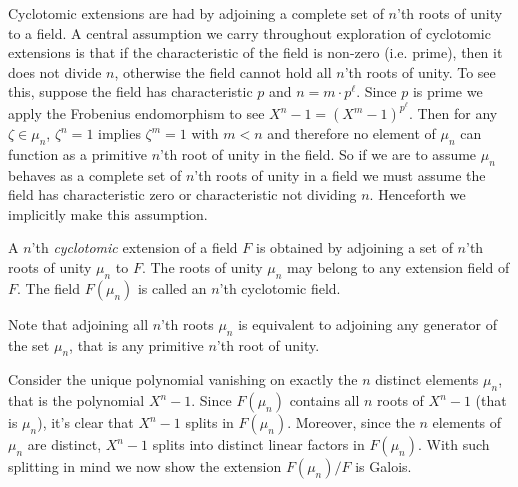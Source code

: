 Cyclotomic extensions are had by adjoining a complete set of $n$'th roots of unity to a field.
A central assumption we carry throughout exploration of cyclotomic extensions is that if the characteristic of the field is non-zero (i.e. prime), then it does not divide $n$, otherwise the field cannot hold all $n$'th roots of unity.
To see this, suppose the field has characteristic $p$ and $n=m\cdot p^\ell$.
Since $p$ is prime we apply the Frobenius endomorphism to see $X^n-1=(X^m-1)^{p^\ell}$.
Then for any $\zeta\in\mu_n$, $\zeta^n=1$ implies $\zeta^m=1$ with $m<n$ and therefore no element of $\mu_n$ can function as a primitive $n$'th root of unity in the field.
So if we are to assume $\mu_n$ behaves as a complete set of $n$'th roots of unity in a field we must assume the field has characteristic zero or characteristic not dividing $n$.
Henceforth we implicitly make this assumption.

\begin{definition}
    A $n$'th \emph{cyclotomic} extension of a field $F$ is obtained by adjoining a set of $n$'th roots of unity $\mu_n$ to $F$.
    The roots of unity $\mu_n$ may belong to any extension field of $F$.
    The field $F(\mu_n)$ is called an $n$'th cyclotomic field.
\end{definition}
Note that adjoining all $n$'th roots $\mu_n$ is equivalent to adjoining any generator of the set $\mu_n$, that is any primitive $n$'th root of unity.

Consider the unique polynomial vanishing on exactly the $n$ distinct elements $\mu_n$, that is the polynomial $X^n-1$.
Since $F(\mu_n)$ contains all $n$ roots of $X^n-1$ (that is $\mu_n$), it's clear that $X^n-1$ splits in $F(\mu_n)$.
Moreover, since the $n$ elements of $\mu_n$ are distinct, $X^n-1$ splits into distinct linear factors in $F(\mu_n)$.
With such splitting in mind we now show the extension $F(\mu_n)/F$ is Galois.

